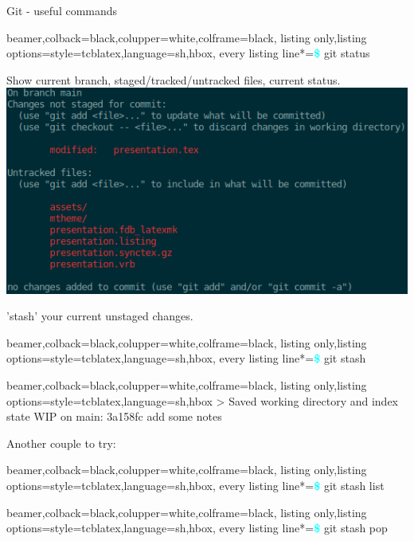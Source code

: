 \documentclass{beamer} %
\begin{document}
  \begin{frame}[fragile]{Git - useful commands}
    \begin{tcblisting}{beamer,colback=black,colupper=white,colframe=black,
      listing only,listing options={style=tcblatex,language=sh},hbox,
      every listing line*={\textcolor{cyan}{\small\ttfamily\bfseries\$}}}
  git status
    \end{tcblisting}
    Show current branch, staged/tracked/untracked files, current status.
    \includegraphics[height=.6\textheight]{git_status_output.png}
  \end{frame}


  \begin{frame}[fragile]
    'stash' your current unstaged changes.\newline
    \begin{tcblisting}{beamer,colback=black,colupper=white,colframe=black,
      listing only,listing options={style=tcblatex,language=sh},hbox,
      every listing line*={\textcolor{cyan}{\small\ttfamily\bfseries\$}}}
  git stash
    \end{tcblisting}
    
    \begin{tcblisting}{beamer,colback=black,colupper=white,colframe=black,
      listing only,listing options={style=tcblatex,language=sh},hbox}
> Saved working directory and index state WIP on main: 3a158fc add some notes
    \end{tcblisting}

    Another couple to try:
    \begin{tcblisting}{beamer,colback=black,colupper=white,colframe=black,
      listing only,listing options={style=tcblatex,language=sh},hbox,
      every listing line*={\textcolor{cyan}{\small\ttfamily\bfseries\$}}}
  git stash list
    \end{tcblisting}

    \begin{tcblisting}{beamer,colback=black,colupper=white,colframe=black,
      listing only,listing options={style=tcblatex,language=sh},hbox,
      every listing line*={\textcolor{cyan}{\small\ttfamily\bfseries\$}}}
  git stash pop
    \end{tcblisting}
    
  \end{frame}
\end{document}
